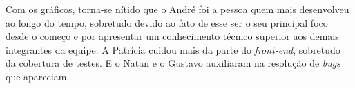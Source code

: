 Com os gráficos, torna-se nítido que o André foi a pessoa quem mais desenvolveu ao longo do tempo, sobretudo devido ao fato de esse ser o seu principal foco desde o começo e por apresentar um conhecimento técnico superior aos demais integrantes da equipe. A Patrícia cuidou mais da parte do \textit{\gls{front-end}}, sobretudo da cobertura de testes. E o Natan e o Gustavo auxiliaram na resolução de \textit{bugs} que apareciam.

